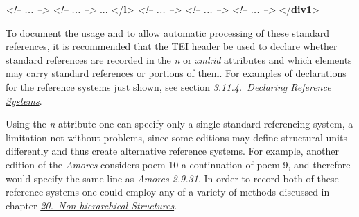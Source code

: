 \begin{shaded}
\textit{<!-- ... -->}\mbox{}\newline 
\hspace*{1em}\mbox{}\newline 
\textit{<!-- ... -->}\mbox{}\newline 
\hspace*{1em}\hspace*{1em} ... {</\textbf{l}>}\mbox{}\newline 
\textit{<!-- ... -->}\mbox{}\newline 
\hspace*{1em}\mbox{}\newline 
\textit{<!-- ... -->}\mbox{}\newline 
{}\mbox{}\newline 
\textit{<!-- ... -->}\mbox{}\newline 
{</\textbf{div1}>}\end{shaded}\egroup\par \par
To document the usage and to allow automatic processing of these standard references, it is recommended that the TEI header be used to declare whether standard references are recorded in the {\itshape n} or {\itshape xml:id} attributes and which elements may carry standard references or portions of them. For examples of declarations for the reference systems just shown, see section \textit{\hyperref[CORS6]{3.11.4.\ Declaring Reference Systems}}.\par
Using the {\itshape n} attribute one can specify only a single standard referencing system, a limitation not without problems, since some editions may define structural units differently and thus create alternative reference systems. For example, another edition of the \textit{Amores} considers poem 10 a continuation of poem 9, and therefore would specify the same line as \textit{Amores 2.9.31}. In order to record both of these reference systems one could employ any of a variety of methods discussed in chapter \textit{\hyperref[NH]{20.\ Non-hierarchical Structures}}.
